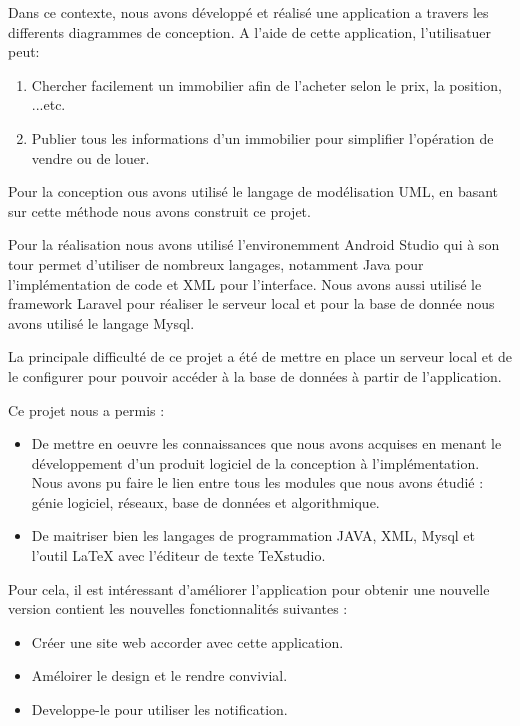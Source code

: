 \documentclass[french,a4,12pt]{report}
\begin{document}
Dans ce contexte, nous avons développé et réalisé une application a travers les differents diagrammes de conception. A l'aide de cette application, l'utilisatuer peut:


\begin{enumerate}
	\item Chercher facilement un immobilier afin de l'acheter selon le prix, la position, ...etc. 
	\item Publier  tous les informations d'un immobilier pour simplifier l'opération de vendre ou de louer.
\end{enumerate}

Pour la conception ous avons utilisé le langage de modélisation UML,  en basant sur cette méthode nous avons construit ce projet.

Pour la réalisation  nous avons utilisé l'environemment Android Studio qui à son tour permet d'utiliser de nombreux langages, notamment Java pour  l'implémentation de code  et XML pour l'interface. Nous avons aussi utilisé le framework Laravel pour réaliser le serveur local et pour la base de donnée nous avons  utilisé le langage Mysql.

La principale difficulté de ce projet a été de mettre en place un serveur local et de le configurer pour pouvoir accéder à la base de données à partir de l'application.

Ce projet nous a permis :
\begin{itemize}
\item De mettre en oeuvre les connaissances que nous avons acquises en menant le développement d'un produit logiciel de la conception à l'implémentation. Nous avons pu faire le lien entre tous les modules que nous avons étudié : génie logiciel, réseaux, base de données et algorithmique.
\item De maitriser bien les langages de programmation JAVA, XML, Mysql et l'outil LaTeX avec l'éditeur de texte TeXstudio. 
\end{itemize}

Pour cela, il est intéressant d'améliorer l'application pour obtenir une nouvelle version contient les nouvelles fonctionnalités suivantes :  
\begin{itemize}
\item Créer une site  web accorder avec cette application. 
\item Améloirer le design et le rendre convivial.
\item Developpe-le pour utiliser les notification. 
\end{itemize}
 
\end{document}
